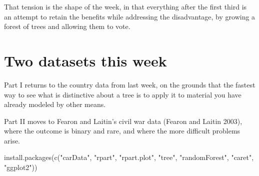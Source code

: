 \documentclass[
  a4paper,
]{scrbook}
\newenvironment{Shaded}{\begin{snugshade}}{\end{snugshade}}
\newcommand{\AttributeTok}[1]{\textcolor[rgb]{0.40,0.45,0.13}{#1}}
\newcommand{\CommentTok}[1]{\textcolor[rgb]{0.37,0.37,0.37}{#1}}
\newcommand{\DecValTok}[1]{\textcolor[rgb]{0.68,0.00,0.00}{#1}}
\newcommand{\FunctionTok}[1]{\textcolor[rgb]{0.28,0.35,0.67}{#1}}
\newcommand{\NormalTok}[1]{\textcolor[rgb]{0.00,0.23,0.31}{#1}}
\newcommand{\OtherTok}[1]{\textcolor[rgb]{0.00,0.23,0.31}{#1}}
\newcommand{\SpecialCharTok}[1]{\textcolor[rgb]{0.37,0.37,0.37}{#1}}
\newcommand{\StringTok}[1]{\textcolor[rgb]{0.13,0.47,0.30}{#1}}
\begin{document}
That tension is the shape of the week, in that everything after the
first third is an attempt to retain the benefits while addressing the
disadvantage, by growing a forest of trees and allowing them to vote.

\section{Two datasets this week}\label{two-datasets-this-week}

Part I returns to the country data from last week, on the grounds that
the fastest way to see what is distinctive about a tree is to apply it
to material you have already modeled by other means.

Part II moves to Fearon and Laitin's civil war data (Fearon and Laitin
2003), where the outcome is binary and rare, and where the more
difficult problems arise.

\begin{Shaded}
\begin{Highlighting}[]
\FunctionTok{install.packages}\NormalTok{(}\FunctionTok{c}\NormalTok{(}\StringTok{"carData"}\NormalTok{, }\StringTok{"rpart"}\NormalTok{, }\StringTok{"rpart.plot"}\NormalTok{, }\StringTok{"tree"}\NormalTok{,}
                   \StringTok{"randomForest"}\NormalTok{, }\StringTok{"caret"}\NormalTok{, }\StringTok{"ggplot2"}\NormalTok{))}
\end{Highlighting}
\end{Shaded}

\begin{Shaded}
\end{Shaded}
\end{document}
